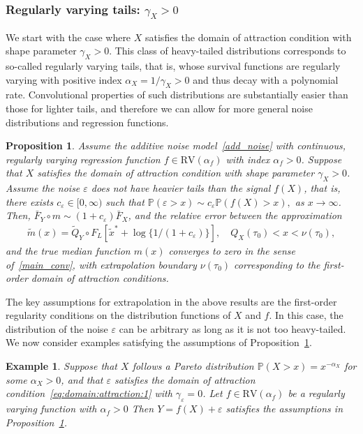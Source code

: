 \documentclass{statsoc}
\newtheorem{proposition}{Proposition}
\newtheorem{example}{Example}
\theoremstyle{break}
\renewcommand{\P}{\mathbb P}
\newcommand{\tauzero}{\tau_0}
\begin{document}
 	
\subsubsection{Regularly varying tails: $\gamma_X > 0$}\label{sec:regularly:v:tails}

We start with the case where $X$ satisfies the domain of attraction 
condition with shape parameter $\gamma_X > 0$. 
This class of heavy-tailed distributions corresponds to so-called regularly varying tails, that is, whose survival functions are regularly varying with positive index $\alpha_X = 1/\gamma_X > 0$ and thus decay with a polynomial rate. 
Convolutional properties of such distributions are substantially easier than 
those for lighter tails, and therefore we can allow for more general
 noise distributions and regression functions. 

 
 \begin{proposition}\label{example:asymptotic:dependence}
	Assume the additive noise model~\eqref{add_noise} with continuous, regularly varying regression function $f \in\text{RV}(\alpha_f)$ with index $\alpha_f > 0$.
	Suppose that $X$ satisfies the domain of attraction condition with shape parameter $\gamma_X > 0$. 
	Assume the noise $\varepsilon$ does not have heavier tails than the signal
	 $f(X)$, that is, there exists $c_\varepsilon \in [0, \infty)$ such that 
	 $\P(\varepsilon > x) \sim c_\varepsilon \P(f(X)>x),$ as $x\to\infty$. 
	Then, $\bar F_Y \circ m \sim (1+c_\varepsilon)\bar F_X$, and the relative error between the approximation 
	\begin{align*} 
	\tilde m(x) =  
	\tilde Q_Y \circ F_L[\tilde x^* + \log\{1/(1+c_\varepsilon)\}], \quad Q_X(\tauzero) <  x < \nu(\tauzero),
	\end{align*}
	and the true median function $m(x)$ converges to zero in the sense of~\eqref{main_conv}, with extrapolation boundary $\nu(\tauzero)$ corresponding to the first-order domain of attraction conditions.
\end{proposition}


 The key assumptions for extrapolation in the above results are the first-order 
 regularity conditions on the distribution functions of $X$ and $f$.
  In this case, the distribution of the noise $\varepsilon$ can be arbitrary 
  as long as it is not too heavy-tailed. 
We now consider examples satisfying the assumptions of Proposition~\ref{example:asymptotic:dependence}. 
	
	

\begin{example}
	Suppose that $X$ follows a Pareto distribution $\P(X > x) = x^{-\alpha_X}$ for some $\alpha_X > 0$, and that $\varepsilon$ satisfies the domain of attraction condition~\eqref{eq:domain:attraction:1} with $\gamma_\varepsilon =0$.
	Let $f\in\text{RV}(\alpha_f)$ be a regularly varying function with $\alpha_f >0$ 
	Then $Y= f(X) + \varepsilon$ satisfies the assumptions 
	in Proposition~\ref{example:asymptotic:dependence}.
\end{example}
\end{document}
